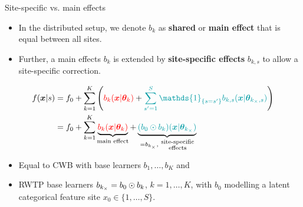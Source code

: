 \documentclass[t,10pt]{beamer}
\begin{document}
\begin{frame}{Site-specific vs. main effects}
  \begin{itemize}
    \item
      In the distributed setup, we denote $b_k$ as {\color{red}\textbf{shared} or \textbf{main effect}} that is equal between all sites.
    \item
      Further, a main effects $b_k$ is extended by {\color{blue}\textbf{site-specific effects} $b_{k,s}$} to allow a site-specific correction.
  \end{itemize}
    \vspace{-0.2cm}
  \begin{align*}
  f(\xv|s) &= f_0 + \sum_{k=1}^K\left({\color{red}b_k(\xv|\tb_k)} + {\color{blue} \sum_{s^\prime=1}^S  \mathds{1}_{\{s = s^\prime\}}b_{k,s}(\xv|\tb_{\lsite,s})}\right) \\
  &= f_0 + \sum_{k=1}^K \underbrace{{\color{red}b_k(\xv|\tb_k)}}_{\text{main effect}} + \underbrace{{\color{blue}(b_0 \odot b_k)(\xv|\tb_{\lsite})}}_{=b_{\lsite},\ \substack{\text{site-specific} \\ \text{effects}}}
  \end{align*}\vspace{-0.4cm}
  \begin{itemize}
        \item 
            Equal to {\color{red}CWB with base learners $b_1, \dots, b_K$} and 
        \item 
            {\color{blue}RWTP base learners $b_{k_\times} = b_0 \odot b_k$}, $k = 1, \dots, K$, with $b_0$ modelling a latent categorical feature site $x_0\in\{1, \dots, S\}$.
  \end{itemize}
  \addtocounter{framenumber}{-1}
\end{frame}
\end{document}
